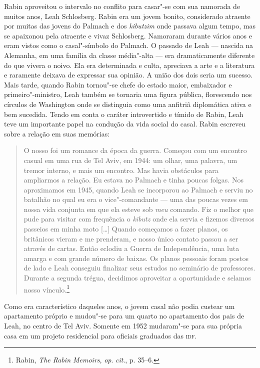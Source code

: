 Rabin aproveitou o intervalo no conflito para casar"-se com sua namorada
de muitos anos, Leah Schlosberg. Rabin era um jovem bonito, considerado
atraente por muitas das jovens do Palmach e dos \textit{kibutzim} onde passava
algum tempo, mas se apaixonou pela atraente e vivaz Schlosberg.
Namoraram durante vários anos e eram vistos como o casal"-símbolo do
Palmach. O passado de Leah --- nascida na Alemanha, em uma família da
classe média"-alta --- era dramaticamente diferente do que vivera o noivo.
Ela era determinada e culta, apreciava a arte e a literatura e raramente
deixava de expressar sua opinião. A união dos dois seria um sucesso. Mais
tarde, quando Rabin tornou"-se chefe do estado maior, embaixador e
primeiro"-ministro, Leah também se tornaria uma figura pública,
florescendo nos círculos de Washington onde se distinguia como uma
anfitriã diplomática ativa e bem sucedida. Tendo em conta o caráter
introvertido e tímido de Rabin, Leah teve um importante papel na
condução da vida social do casal. Rabin escreveu sobre a relação em suas
memórias:

\begin{quote}
O nosso foi um romance da época da guerra. Começou com um encontro
casual em uma rua de Tel Aviv, em 1944: um olhar, uma palavra, um tremor
interno, e mais um encontro. Mas havia obstáculos para ampliarmos a
relação. Eu estava no Palmach e tinha poucas folgas. Nos aproximamos em
1945, quando Leah se incorporou ao Palmach e serviu no batalhão no qual
eu era o vice"-comandante --- uma das poucas vezes em nossa vida conjunta
em que ela esteve sob \textit{meu} comando. Fiz o melhor que pude para
visitar com frequência o \textit{kibutz} onde ela servia e fizemos diversos
passeios em minha moto {[}\ldots{}{]} Quando começamos a fazer planos, os britânicos
vieram e me prenderam, e nosso único contato passou a ser através de
cartas. Então eclodiu a Guerra de Independência, uma luta amarga e com
grande número de baixas. Os planos pessoais foram postos de lado e Leah
conseguiu finalizar seus estudos no seminário de professores. Durante a
segunda trégua, decidimos aproveitar a oportunidade e selamos nosso
vínculo.\footnote{Rabin, \textit{The Rabin Memoirs}, \textit{op}. \textit{cit}., p. 35--6.}
\end{quote}

Como era característico daqueles anos, o jovem casal não podia custear
um apartamento próprio e mudou"-se para um quarto no apartamento
dos pais de Leah, no centro de Tel Aviv. Somente em 1952 mudaram"-se para
sua própria casa em um projeto residencial para oficiais graduados das
\textsc{idf}.

